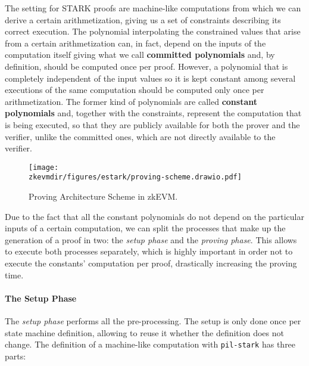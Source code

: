 

The setting for STARK proofs are machine-like computations from which we can derive a certain arithmetization, giving us a set of constraints describing its correct execution. The polynomial interpolating the constrained values that arise from a certain arithmetization can, in fact, depend on the inputs of the computation itself giving what we call \textbf{committed polynomials} and, by definition, should be computed once per proof. However, a polynomial that is completely independent of the input values so it is kept constant among several executions of the same computation should be computed only once per arithmetization. The former kind of polynomials are called \textbf{constant polynomials} and, together with the constraints, represent the computation that is being executed, so that they are publicly available for both the prover and the verifier, unlike the committed ones, which are not directly available to the verifier.

\begin{figure}[H]
\centering
\texttt{[image: \\zkevmdir/figures/estark/proving-scheme.drawio.pdf]}
\caption{Proving Architecture Scheme in zkEVM.}
\label{fig:proving-arch-scheme}
\end{figure}

Due to the fact that all the constant polynomials do not depend on the particular inputs of a certain computation, we can split the processes that make up the generation of a proof in two: the \textit{setup phase} and the \textit{proving phase}. This allows to execute both processes separately, which is highly important in order not to execute the constants' computation per proof, drastically increasing the proving time.

\paragraph*{The Setup Phase}

The \textit{setup phase} performs all the pre-processing. The setup is only done once per state machine definition, allowing to reuse it whether the definition does not change. The definition of a machine-like computation with \texttt{pil-stark} has three parts:

